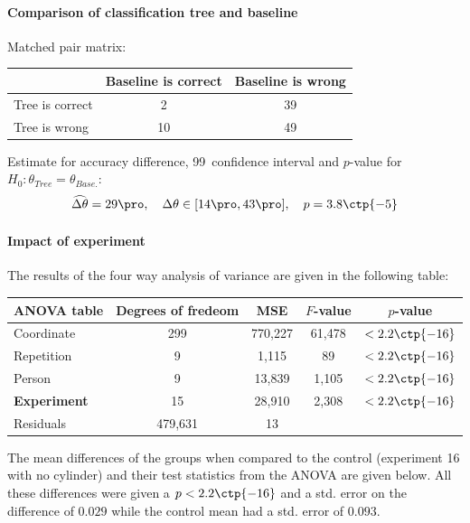 \documentclass[11pt,fleqn]{article}
\begin{document}
\paragraph{Comparison of classification tree and baseline}
Matched pair matrix:

\begin{table}[H]
	\centering
	\begin{tabular}{l|c c}
		&Baseline is correct& Baseline is wrong \\
		\hline
		Tree is correct &2& 39\\
		Tree is wrong& 10& 49
	\end{tabular}
\end{table}\noindent 
Estimate for accuracy difference, 99\pro\ confidence interval and \(p\)-value for \(H_0: \theta_{Tree}=\theta_{Base.}\):
\[
\widehat{\Delta \theta} = 29\pro,\quad  \Delta \theta\in[14\pro , 43\pro], \quad p = 3.8\ctp{-5}
\]

\paragraph{Impact of experiment} The results of the four way analysis of variance are given in the following table:

\begin{table}[H]
	\centering
	\begin{tabular}{l | c c c c}
		ANOVA table & Degrees of fredeom& MSE&\(F\)-value&\(p\)-value\\
		\hline 
		Coordinate  & 299 & 770,227 & 		61,478 	& \(<2.2\ctp{-16}\)	\\
		Repetition  & 9 &  1,115 & 			89	 	&\(<2.2\ctp{-16}\)  \\
		Person  & 9 & 13,839 &	 			1,105 	&\(<2.2\ctp{-16}\)	\\
		\textbf{Experiment}  & 15 &  28,910 & 2,308 & \(<2.2\ctp{-16}\)	\\
		Residuals &479,631 & 13 &			
	\end{tabular}
		\label{tab:ranova}
\end{table}\noindent
The mean differences of the groups when compared to the control (experiment 16 with no cylinder) and their test statistics from the ANOVA are given below. All these differences were given a \(p<2.2\ctp{-16}\) and a std. error on the difference of \(0.029\) while the control mean had a std. error of \(0.093\).
\end{document}
